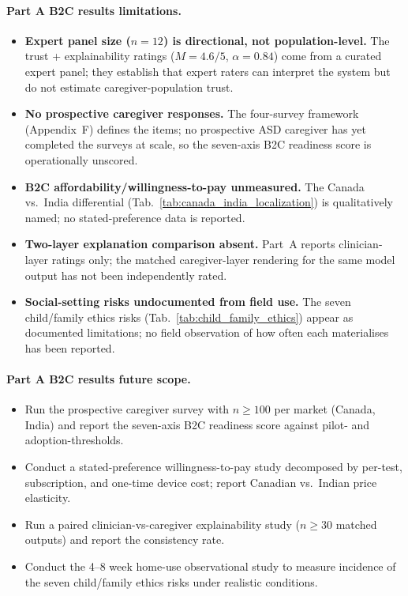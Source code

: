 \paragraph{Part A B2C results limitations.}
\begin{itemize}[leftmargin=*, itemsep=2pt]
    \item \textbf{Expert panel size ($n = 12$) is directional, not population-level.} The trust + explainability ratings ($M = 4.6/5$, $\alpha = 0.84$) come from a curated expert panel; they establish that expert raters can interpret the system but do not estimate caregiver-population trust.
    \item \textbf{No prospective caregiver responses.} The four-survey framework (Appendix~F) defines the items; no prospective ASD caregiver has yet completed the surveys at scale, so the seven-axis B2C readiness score is operationally unscored.
    \item \textbf{B2C affordability/willingness-to-pay unmeasured.} The Canada vs.\ India differential (Tab.~\ref{tab:canada_india_localization}) is qualitatively named; no stated-preference data is reported.
    \item \textbf{Two-layer explanation comparison absent.} Part~A reports clinician-layer ratings only; the matched caregiver-layer rendering for the same model output has not been independently rated.
    \item \textbf{Social-setting risks undocumented from field use.} The seven child/family ethics risks (Tab.~\ref{tab:child_family_ethics}) appear as documented limitations; no field observation of how often each materialises has been reported.
\end{itemize}

\paragraph{Part A B2C results future scope.}
\begin{itemize}[leftmargin=*, itemsep=2pt]
    \item Run the prospective caregiver survey with $n \geq 100$ per market (Canada, India) and report the seven-axis B2C readiness score against pilot- and adoption-thresholds.
    \item Conduct a stated-preference willingness-to-pay study decomposed by per-test, subscription, and one-time device cost; report Canadian vs.\ Indian price elasticity.
    \item Run a paired clinician-vs-caregiver explainability study ($n \geq 30$ matched outputs) and report the consistency rate.
    \item Conduct the 4--8 week home-use observational study to measure incidence of the seven child/family ethics risks under realistic conditions.
\end{itemize}

